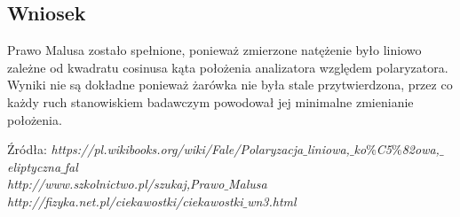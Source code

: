 \documentclass{article}
\begin{document}
\subsection{Wniosek}
Prawo Malusa zostało spełnione, ponieważ zmierzone natężenie było liniowo zależne od kwadratu cosinusa kąta położenia analizatora względem polaryzatora. Wyniki nie są dokładne ponieważ żarówka nie była stale przytwierdzona, przez co każdy ruch stanowiskiem badawczym powodował jej minimalne zmienianie położenia. 

\begin{flushright}
\begin{scriptsize}
Źródła: \textit{https://pl.wikibooks.org/wiki/Fale/Polaryzacja$\_$liniowa,$\_$ko$\%$C5$\%$82owa,$\_$eliptyczna$\_$fal} \\
\textit{http://www.szkolnictwo.pl/szukaj,Prawo$\_$Malusa}\\
\textit{http://fizyka.net.pl/ciekawostki/ciekawostki$\_$wn3.html}
\end{scriptsize}
\end{flushright}
\end{document}
